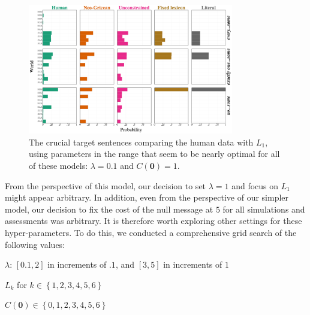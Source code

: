 \documentclass[leqno,12pt]{article}
\newcommand{\set}[1]{\ensuremath{\left\{ #1 \right\}}}
\newcommand{\Costs}{C}
\newcommand{\UncertaintyListener}[1][]{L_{#1}}
\newcommand{\nullmsg}{\mathbf{0}}
\begin{document}
{\begin{appendix}
\begin{figure}[!t]
  \centering
  \includegraphics[width=0.8\textwidth]{allmodels-paramexplore-binary}
  \caption{The crucial target sentences comparing the human data with
    $\UncertaintyListener[1]$, using parameters in the range that seem
    to be nearly optimal for all of these models: $\lambda=0.1$ and
    $\Costs(\nullmsg)=1$.}
  \label{fig:optimal}
\end{figure}

From the perspective of this model, our decision to set $\lambda=1$
and focus on $\UncertaintyListener[1]$ might appear arbitrary.  In
addition, even from the perspective of our simpler model, our decision
to fix the cost of the null message at $5$ for all simulations and
assessments was arbitrary. It is therefore worth exploring other
settings for these hyper-parameters. To do this, we conducted a
comprehensive grid search of the following values:
%
\begin{examples}
\item
  \begin{examples}
  \item $\lambda$: $[0.1, 2]$ in increments of $.1$, and $[3,5]$ in increments of $1$
  \item $\UncertaintyListener[k]$ for $k \in \set{1,2,3,4,5,6}$
  \item $\Costs(\nullmsg) \in \set{0, 1, 2, 3, 4, 5, 6}$
  \end{examples}
\end{examples}


\end{appendix}}
\end{document}
